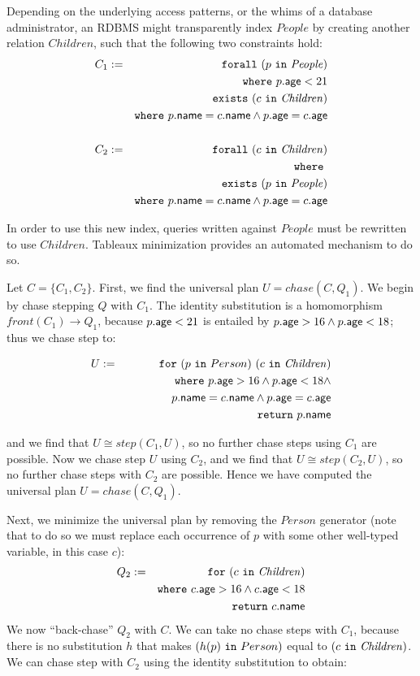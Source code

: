 \documentclass{sigplanconf}
\newcommand{\FOR}{{\tt for}\relax\ifmmode\ \else\xspace\fi}
\newcommand{\FORALL}{{\tt forall}\relax\ifmmode\ \else\xspace\fi}
\newcommand{\EXISTS}{{\tt exists}\relax\ifmmode\ \else\xspace\fi}
\newcommand{\WHERE}{{\tt where}\relax\ifmmode\ \else\xspace\fi}
\newcommand{\IN}{ \ {\tt in} \ }
\newcommand{\RETURN}{{\tt return}\relax\ifmmode\ \else\xspace\fi}
\newcommand{\relation}[1]{\ensuremath{\mathit{#1}}\xspace}
\begin{document}
Depending on the underlying access patterns, or the whims of a database administrator, an RDBMS might transparently index \relation{People} by creating another relation \relation{Children}, such that the following two constraints hold:
\begin{eqnarray*}
C_1 & := & \FORALL (p \IN \relation{People}) \\
 & & \WHERE p.{\sf age} < 21 \\
 & & \EXISTS (c \IN \relation{Children}) \\
 & & \WHERE p.{\sf name} = c.{\sf name} \wedge p.{\sf age} = c.{\sf age}  \\
 & & \\
  C_2 & := & \FORALL (c \IN \relation{Children}) \\
  & & \WHERE \\
 & & \EXISTS (p \IN \relation{People}) \\
 & & \WHERE p.{\sf name} = c.{\sf name} \wedge p.{\sf age} = c.{\sf age}
\end{eqnarray*}

In order to use this new index, queries written against \relation{People} must be rewritten to use \relation{Children}.
Tableaux minimization provides an automated mechanism to do so.

Let $C = \{ C_1, C_2\}$.  First, we find the universal plan $U = chase(C, Q_1)$.  We begin by chase stepping $Q$ with $C_1$.  The identity substitution is a homomorphism $front(C_1) \to Q_1$, because $p.{\sf age} < 21$ is entailed by $p.{\sf age} > 16 \wedge p.{\sf age} < 18$; thus we chase step to:
\begin{normalsize}
\begin{eqnarray*}
U & := & \FOR (p \IN Person) \ (c \IN \relation{Children}) \\
 & & \WHERE p.{\sf age} > 16 \wedge p.{\sf age} < 18 \wedge \\
 & & \ \ \ \ \ \ \ \ \ \ \ \ p.{\sf name} = c.{\sf name} \wedge p.{\sf age} = c.{\sf age} \\
 & & \RETURN p.{\sf name}
\end{eqnarray*}  
\end{normalsize}
and we find that $U \cong step(C_1, U)$, so no further chase steps using $C_1$ are possible.  Now we chase step $U$ using $C_2$, and we find that $U \cong step(C_2, U)$, so no further chase steps with $C_2$ are possible.  Hence we have computed the universal plan $U = chase(C,Q_1)$.

Next, we minimize the universal plan by removing the \relation{Person} generator (note that to do so we must replace each occurrence of $p$ with some other well-typed variable, in this case $c$):
\begin{eqnarray*}
Q_2 & := & \FOR (c \IN \relation{Children}) \\
 & & \WHERE c.{\sf age} > 16 \wedge c.{\sf age} < 18 \\
  & & \RETURN c.{\sf name}
\end{eqnarray*}  
We now ``back-chase'' $Q_2$ with $C$.  We can take no chase steps with $C_1$, because there is no substitution $h$ that makes $(h(p) \IN Person)$ equal to $(c \IN \relation{Children})$.  We can chase step with $C_2$ using the identity substitution to obtain:
\end{document}
